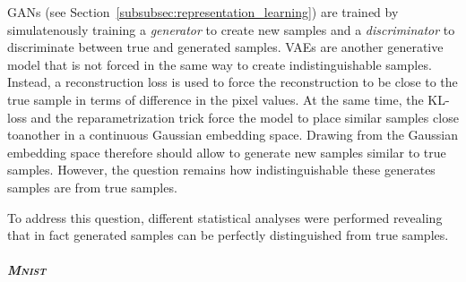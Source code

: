 \acp{GAN} (see Section~\ref{subsubsec:representation_learning}) are trained by simulatenously training a \textit{generator} to create new samples and a \textit{discriminator} to discriminate between true and generated samples.
\acp{VAE} are another generative model that is not forced in the same way to create indistinguishable samples.
Instead, a reconstruction loss is used to force the reconstruction to be close to the true sample in terms of difference in the pixel values.
At the same time, the \ac{KL}-loss and the reparametrization trick force the model to place similar samples close toanother in a continuous Gaussian embedding space.
Drawing from the Gaussian embedding space therefore should allow to generate new samples similar to true samples.
However, the question remains how indistinguishable these generates samples are from true samples.

To address this question, different statistical analyses were performed revealing that in fact generated samples can be perfectly distinguished from true samples.

\subparagraph{\textsc{Mnist}}

